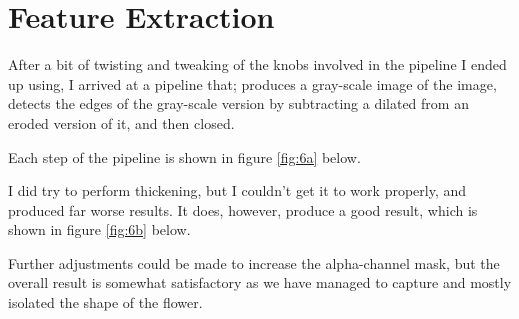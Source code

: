 %
%

\section{Feature Extraction}
After a bit of twisting and tweaking of the knobs involved in the pipeline I
ended up using, I arrived at a pipeline that; produces a gray-scale image of
the image, detects the edges of the gray-scale version by subtracting a
dilated from an eroded version of it, and then closed.

Each step of the pipeline is shown in figure \ref{fig:6a} below.


I did try to perform thickening, but I couldn't get it to work properly, and
produced far worse results. It does, however, produce a good result, which is
shown in figure \ref{fig:6b} below.


Further adjustments could be made to increase the alpha-channel mask, but the
overall result is somewhat satisfactory as we have managed to capture and
mostly isolated the shape of the flower.

